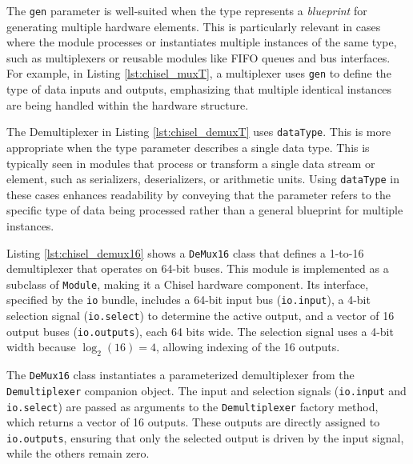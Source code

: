 {The \texttt{gen} parameter is well-suited when the type represents a \textit{blueprint} for generating multiple hardware elements. This is particularly relevant in cases where the module processes or instantiates multiple instances of the same type, such as multiplexers or reusable modules like FIFO queues and bus interfaces. For example, in Listing \ref{lst:chisel_muxT}, a multiplexer uses \texttt{gen} to define the type of data inputs and outputs, emphasizing that multiple identical instances are being handled within the hardware structure. 

The Demultiplexer in Listing \ref{lst:chisel_demuxT} uses \texttt{dataType}. This is more appropriate when the type parameter describes a single data type. This is typically seen in modules that process or transform a single data stream or element, such as serializers, deserializers, or arithmetic units. Using \texttt{dataType} in these cases enhances readability by conveying that the parameter refers to the specific type of data being processed rather than a general blueprint for multiple instances. 


Listing \ref{lst:chisel_demux16} shows a \texttt{DeMux16} class that defines a 1-to-16 demultiplexer that operates on 64-bit buses. This module is implemented as a subclass of \texttt{Module}, making it a Chisel hardware component. Its interface, specified by the \texttt{io} bundle, includes a 64-bit input bus (\texttt{io.input}), a 4-bit selection signal (\texttt{io.select}) to determine the active output, and a vector of 16 output buses (\texttt{io.outputs}), each 64 bits wide. The selection signal uses a 4-bit width because \(\log_2(16) = 4\), allowing indexing of the 16 outputs.

The \texttt{DeMux16} class instantiates a parameterized demultiplexer from the \texttt{Demultiplexer} companion object. The input and selection signals (\texttt{io.input} and \texttt{io.select}) are passed as arguments to the \texttt{Demultiplexer} factory method, which returns a vector of 16 outputs. These outputs are directly assigned to \texttt{io.outputs}, ensuring that only the selected output is driven by the input signal, while the others remain zero.

}%

